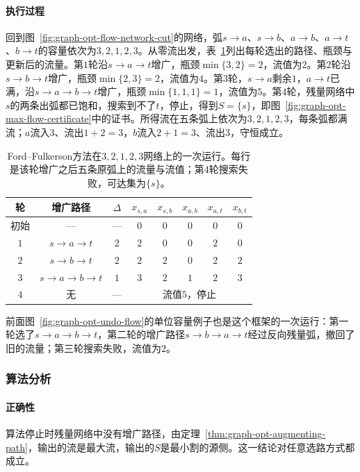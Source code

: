 \paragraph{执行过程}
回到图~\ref{fig:graph-opt-flow-network-cut}的网络，弧$s\to a$、$s\to b$、$a\to b$、$a\to t$、$b\to t$的容量依次为$3,2,1,2,3$。从零流出发，表~\ref{tab:graph-opt-ford-fulkerson-trace}列出每轮选出的路径、瓶颈与更新后的流量。第$1$轮沿$s\to a\to t$增广，瓶颈$\min\{3,2\}=2$，流值为$2$。第$2$轮沿$s\to b\to t$增广，瓶颈$\min\{2,3\}=2$，流值为$4$。第$3$轮，$s\to a$剩余$1$，$a\to t$已满，沿$s\to a\to b\to t$增广，瓶颈$\min\{1,1,1\}=1$，流值为$5$。第$4$轮，残量网络中$s$的两条出弧都已饱和，搜索到不了$t$，停止，得到$S=\{s\}$，即图~\ref{fig:graph-opt-max-flow-certificate}中的证书。所得流在五条弧上依次为$3,2,1,2,3$，每条弧都满流；$a$流入$3$、流出$1+2=3$，$b$流入$2+1=3$、流出$3$，守恒成立。

\begin{table}[!htb]
  \centering
  \caption{Ford--Fulkerson方法在$3,2,1,2,3$网络上的一次运行。每行是该轮增广之后五条原弧上的流量与流值；第$4$轮搜索失败，可达集为$\{s\}$。}
  \label{tab:graph-opt-ford-fulkerson-trace}
  \begin{tabular}{@{}cccccccc@{}}
    \toprule
    轮 & 增广路径 & $\Delta$ & $x_{s,a}$ & $x_{s,b}$ & $x_{a,b}$ & $x_{a,t}$ & $x_{b,t}$ \\
    \midrule
    初始 & — & — & $0$ & $0$ & $0$ & $0$ & $0$ \\
    $1$ & $s\to a\to t$ & $2$ & $2$ & $0$ & $0$ & $2$ & $0$ \\
    $2$ & $s\to b\to t$ & $2$ & $2$ & $2$ & $0$ & $2$ & $2$ \\
    $3$ & $s\to a\to b\to t$ & $1$ & $3$ & $2$ & $1$ & $2$ & $3$ \\
    $4$ & 无 & — & \multicolumn{5}{c}{流值$5$，停止} \\
    \bottomrule
  \end{tabular}
\end{table}

前面图~\ref{fig:graph-opt-undo-flow}的单位容量例子也是这个框架的一次运行：第一轮选了$s\to a\to b\to t$，第二轮的增广路径$s\to b\to a\to t$经过反向残量弧，撤回了旧的流量；第三轮搜索失败，流值为$2$。

\subsubsection{算法分析}

\paragraph{正确性}
算法停止时残量网络中没有增广路径，由定理~\ref{thm:graph-opt-augmenting-path}，输出的流是最大流，输出的$S$是最小割的源侧。这一结论对任意选路方式都成立。

